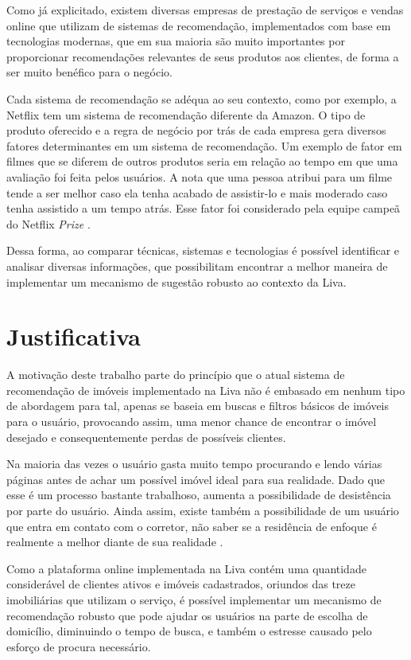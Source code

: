 Como já explicitado, existem diversas empresas de prestação de serviços e vendas online que utilizam de sistemas de recomendação, implementados com base em tecnologias modernas, que em sua maioria são muito importantes por proporcionar recomendações relevantes de seus produtos aos clientes, de forma a ser muito benéfico para o negócio. 

Cada sistema de recomendação se adéqua ao seu contexto, como por exemplo, a Netflix tem um sistema de recomendação diferente da Amazon. O tipo de produto oferecido e a regra de negócio por trás de cada empresa gera diversos fatores determinantes em um sistema de recomendação. Um exemplo de fator em filmes que se diferem de outros produtos seria em relação ao tempo em que uma avaliação foi feita pelos usuários. A nota que uma pessoa atribui para um filme tende a ser melhor caso ela tenha acabado de assistir-lo e mais moderado caso tenha assistido a um tempo atrás. Esse fator foi considerado pela equipe campeã do Netflix \textit{Prize} \cite{GARCIA:2015}.
 
 Dessa forma, ao comparar técnicas, sistemas e tecnologias é possível identificar e analisar diversas informações, que possibilitam encontrar a melhor maneira de implementar um mecanismo de sugestão robusto ao contexto da Liva.

\section{Justificativa}

A motivação deste trabalho parte do princípio que o atual sistema de recomendação de imóveis implementado na Liva não é embasado em nenhum tipo de abordagem para tal, apenas se baseia em buscas e filtros básicos de imóveis para o usuário, provocando assim, uma menor chance de encontrar o imóvel desejado e consequentemente perdas de possíveis clientes.

Na maioria das vezes o usuário gasta muito tempo procurando e lendo várias páginas antes de achar um possível imóvel ideal para sua realidade. Dado que esse é um processo bastante trabalhoso, aumenta a possibilidade de desistência por parte do usuário. Ainda assim, existe também a possibilidade de um usuário que entra em contato com o corretor, não saber se a residência de enfoque é realmente a melhor diante de sua realidade \cite{Summo:2017}.

Como a plataforma online implementada na Liva contém uma quantidade considerável de clientes ativos e imóveis cadastrados, oriundos das treze imobiliárias que utilizam o serviço, é possível implementar um mecanismo de recomendação robusto que pode ajudar os usuários na parte de escolha de domicílio, diminuindo o tempo de busca, e também o estresse causado pelo esforço de procura necessário.

